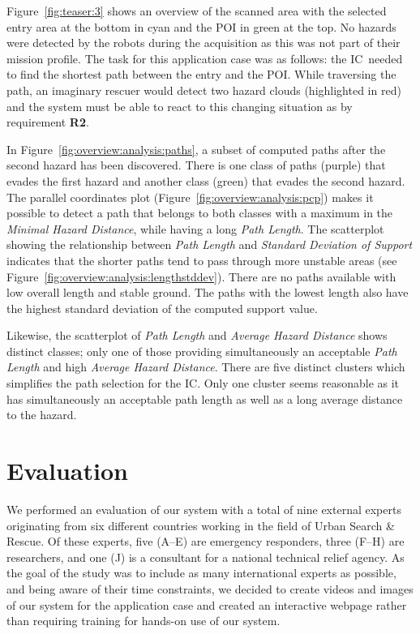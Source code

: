\documentclass[review,journal]{vgtc}         %
\def\IC{IC}
\begin{document}
Figure~\ref{fig:teaser:3} shows an overview of the scanned area with the selected entry area at the bottom in cyan and the POI in green at the top. No hazards were detected by the robots during the acquisition as this was not part of their mission profile. The task for this application case was as follows: the \IC\ needed to find the shortest path between the entry and the POI. While traversing the path, an imaginary rescuer would detect two hazard clouds (highlighted in red) and the system must be able to react to this changing situation as by requirement {\bfseries R2}.

In Figure~\ref{fig:overview:analysis:paths}, a subset of computed paths after the second hazard has been discovered. There is one class of paths (purple) that evades the first hazard and another class (green) that evades the second hazard. The parallel coordinates plot (Figure~\ref{fig:overview:analysis:pcp}) makes it possible to detect a path that belongs to both classes with a maximum in the \emph{Minimal Hazard Distance}, while having a long \emph{Path Length}. The scatterplot showing the relationship between \emph{Path Length} and \emph{Standard Deviation of Support} indicates that the shorter paths tend to pass through more unstable areas (see Figure~\ref{fig:overview:analysis:lengthstddev}). There are no paths available with low overall length and stable ground. The paths with the lowest length also have the highest standard deviation of the computed support value.

Likewise, the scatterplot of \emph{Path Length} and \emph{Average Hazard Distance} shows distinct classes; only one of those providing simultaneously an acceptable \emph{Path Length} and high \emph{Average Hazard Distance}. There are five distinct clusters which simplifies the path selection for the \IC . Only one cluster seems reasonable as it has simultaneously an acceptable path length as well as a long average distance to the hazard.


\section{Evaluation} \label{sec:evaluation}
We performed an evaluation of our system with a total of nine external experts originating from six different countries working in the field of Urban Search \& Rescue. Of these experts, five (A--E) are emergency responders, three (F--H) are researchers, and one (J) is a consultant for a national technical relief agency. As the goal of the study was to include as many international experts as possible, and being aware of their time constraints, we decided to create videos and images of our system for the application case and created an interactive webpage rather than requiring training for hands-on use of our system.
\end{document}
